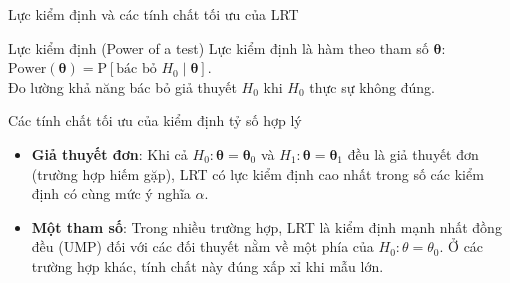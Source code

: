 \begin{frame}[t]{Lực kiểm định và các tính chất tối ưu của LRT}
  \begin{block}{Lực kiểm định (Power of a test)}
    Lực kiểm định là hàm theo tham số $\boldsymbol{\theta}$: $\text{Power}(\boldsymbol{\theta}) = \mathrm{P}[\text{bác bỏ } H_0 \mid \boldsymbol{\theta}]$.\\
    Đo lường khả năng bác bỏ giả thuyết $H_0$ khi $H_0$ thực sự không đúng.
  \end{block}

  \begin{exampleblock}{Các tính chất tối ưu của kiểm định tỷ số hợp lý}
    \begin{itemize}
      \item \textbf{Giả thuyết đơn}: Khi cả $H_0:\boldsymbol\theta=\boldsymbol\theta_0$ và $H_1:\boldsymbol\theta=\boldsymbol\theta_1$ đều là giả thuyết đơn (trường hợp hiếm gặp), LRT có lực kiểm định cao nhất trong số các kiểm định có cùng mức ý nghĩa $\alpha$.

      \item \textbf{Một tham số}: Trong nhiều trường hợp, LRT là kiểm định mạnh nhất đồng đều (UMP) đối với các đối thuyết nằm về một phía của $H_0:\theta=\theta_0$. Ở các trường hợp khác, tính chất này đúng xấp xỉ khi mẫu lớn.
    \end{itemize}
  \end{exampleblock}
\end{frame}

